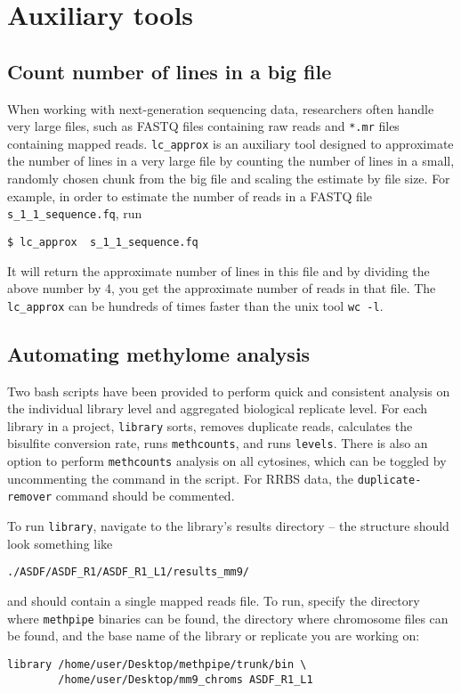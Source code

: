 \documentclass[10pt]{article}
\newcommand{\prog}[1]{\texttt{#1}}
\newcommand{\fn}[1]{\texttt{#1}}
\begin{document}
\section{Auxiliary tools}
\label{sec:auxiliary-tools}

\subsection{Count number of lines in a big file}
\label{sec:count-number-lines}

When working with next-generation sequencing data, researchers often
handle very large files, such as FASTQ files containing raw reads
and \fn{*.mr} files containing mapped reads. \prog{lc\_approx} is
an auxiliary tool designed to approximate the number of lines in a
very large file by counting the number of lines in a small, randomly
chosen chunk from the big file and scaling the estimate by file size.
For example, in order to estimate the number of reads in a FASTQ file
\fn{s\_1\_1\_sequence.fq}, run
\begin{verbatim}
$ lc_approx  s_1_1_sequence.fq
\end{verbatim}
It will return the approximate number of lines in this file and by
dividing the above number by 4, you get the approximate number of
reads in that file. The \prog{lc\_approx} can be hundreds of times
faster than the unix tool \prog{wc -l}.

\subsection{Automating methylome analysis}
\label{sec:automate-library-level}
Two bash scripts have been provided to perform quick and consistent analysis
on the individual library level and aggregated biological replicate level.
For each library in a project, \prog{library} sorts, removes duplicate
reads, calculates the bisulfite conversion rate, runs \prog{methcounts}, and
runs \prog{levels}. There is also an option to perform \prog{methcounts}
analysis on all cytosines, which can be toggled by uncommenting the command
in the script. For RRBS data, the \prog{duplicate-remover} command should
be commented.

To run \prog{library}, navigate to the library's results directory --
the structure should look something like
\begin{verbatim}
./ASDF/ASDF_R1/ASDF_R1_L1/results_mm9/
\end{verbatim}
and should contain a single mapped reads file. To run, specify the directory
where \prog{methpipe} binaries can be found, the directory where chromosome
files can be found, and the base name of the library or replicate you are
working on:
\begin{verbatim}
library /home/user/Desktop/methpipe/trunk/bin \
        /home/user/Desktop/mm9_chroms ASDF_R1_L1
\end{verbatim}
\end{document}
